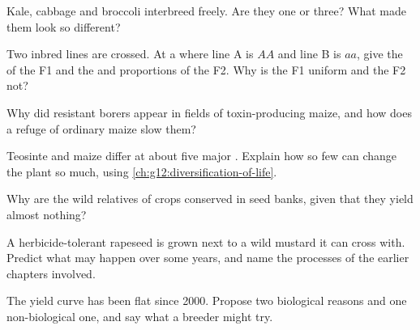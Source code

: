 \begin{exercise}[$\star\star$]\label{exo:g12:domesticated-plants:7}
Kale, cabbage and broccoli interbreed freely. Are they one  or
three? What made them look so different?
\end{exercise}

\begin{exercise}[$\star\star$]\label{exo:g12:domesticated-plants:8}
Two inbred lines are crossed. At a  where line A is $AA$ and line
B is $aa$, give the  of the F1 and the  and
proportions of the F2. Why is the F1 uniform and the F2 not?
\end{exercise}

\begin{exercise}[$\star\star$]\label{exo:g12:domesticated-plants:9}
Why did resistant borers appear in fields of toxin-producing maize,
and how does a refuge of ordinary maize slow them?
\end{exercise}

\begin{exercise}[$\star\star$]\label{exo:g12:domesticated-plants:10}
Teosinte and maize differ at about five major . Explain how so
few  can change the plant so much, using
\cref{ch:g12:diversification-of-life}.
\end{exercise}

\begin{exercise}[$\star\star$]\label{exo:g12:domesticated-plants:11}
Why are the wild relatives of crops conserved in seed banks, given
that they yield almost nothing?
\end{exercise}

\begin{exercise}[$\star\star\star$]\label{exo:g12:domesticated-plants:12}
A herbicide-tolerant rapeseed is grown next to a wild mustard it can
cross with. Predict what may happen over some years, and name the
processes of the earlier chapters involved.
\end{exercise}

\begin{exercise}[$\star\star\star$]\label{exo:g12:domesticated-plants:13}
The yield curve has been flat since 2000. Propose two biological
reasons and one non-biological one, and say what a breeder might try.
\end{exercise}

